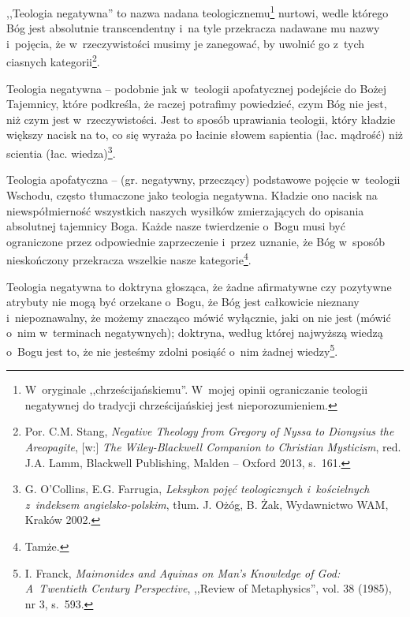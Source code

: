 \begin{defin}
,,Teologia negatywna'' to nazwa nadana teologicznemu\footnote{W~oryginale ,,chrześcijańskiemu''. W~mojej opinii ograniczanie teologii negatywnej do tradycji chrześcijańskiej jest nieporozumieniem.} nurtowi, wedle którego Bóg jest absolutnie transcendentny i~na tyle przekracza nadawane mu nazwy i~pojęcia, że w~rzeczywistości musimy je zanegować, by uwolnić go z~tych ciasnych kategorii\footnote{Por. C.M. Stang, \textit{Negative Theology from Gregory of Nyssa to Dionysius the Areopagite}, [w:] \textit{The Wiley-Blackwell Companion to Christian Mysticism}, red. J.A. Lamm, Blackwell Publishing, Malden -- Oxford 2013, s.~161.}.
\end{defin}
\begin{defin}
Teologia negatywna -- podobnie jak w~teologii apofatycznej podejście do Bożej Tajemnicy, które podkreśla, że raczej potrafimy powiedzieć, czym Bóg nie jest, niż czym jest w~rzeczywistości. Jest to sposób uprawiania teologii, który kładzie większy nacisk na to, co się wyraża po łacinie słowem sapientia (łac. mądrość) niż scientia (łac. wiedza)\footnote{G. O'Collins, E.G. Farrugia, \textit{Leksykon pojęć teologicznych i~kościelnych z~indeksem angielsko-polskim}, tłum. J. Ożóg, B. Żak, Wydawnictwo WAM, Kraków 2002.}.
\end{defin}
\begin{defin}
Teologia apofatyczna -- (gr. negatywny, przeczący) podstawowe pojęcie w~teologii Wschodu, często tłumaczone jako teologia negatywna. Kładzie ono nacisk na niewspółmierność wszystkich naszych wysiłków zmierzających do opisania absolutnej tajemnicy Boga. Każde nasze twierdzenie o~Bogu musi być ograniczone przez odpowiednie zaprzeczenie i~przez uznanie, że Bóg w~sposób nieskończony przekracza wszelkie nasze kategorie\footnote{Tamże.}.
\end{defin}
\begin{defin}\label{int-deftn-last}
Teologia negatywna to doktryna głosząca, że żadne afirmatywne czy pozytywne atrybuty nie mogą być orzekane o~Bogu, że Bóg jest całkowicie nieznany i~niepoznawalny, że możemy znacząco mówić wyłącznie, jaki on nie jest (mówić o~nim w~terminach negatywnych); doktryna, według której najwyższą wiedzą o~Bogu jest to, że nie jesteśmy zdolni posiąść o~nim żadnej wiedzy\footnote{I. Franck, \textit{Maimonides and Aquinas on Man's Knowledge of God: A~Twentieth Century Perspective}, ,,Review of Metaphysics'', vol. 38 (1985), nr 3, s.~593.}.
\end{defin}

